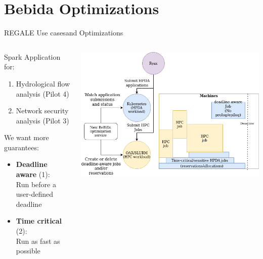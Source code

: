 \documentclass[10pt, compress, titleprogressbar, aspectratio=169]{beamer}
\begin{document}
        \section{Bebida Optimizations}

        \begin{frame}{REGALE Use cases}{and Optimizations}
            \begin{columns}
                \begin{column}{0.45\textwidth}
            \begin{exampleblock}{Spark Application for:}
                \begin{enumerate}
                    \item Hydrological flow analysis (Pilot 4)
                    \item Network security analysis (Pilot 3)
                \end{enumerate}
            \end{exampleblock}
            \hfill \break
            We want more guarantees:
            \begin{itemize}
                \item \textbf{Deadline aware} (1):\\ Run before a user-defined deadline
                \item \textbf{Time critical} (2):\\ Run as fast as possible
            \end{itemize}
                \end{column}
                \begin{column}{0.55\textwidth}
                    \begin{center}
                        \includegraphics[width=\linewidth, height=\textheight, keepaspectratio]{../figureBOS.png}
                    \end{center}
                \end{column}
            \end{columns}
        \end{frame}
\end{document}
